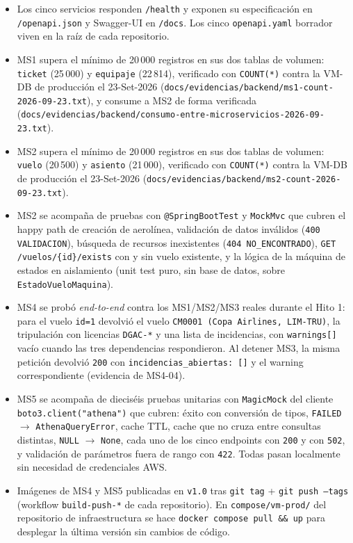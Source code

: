 \begin{itemize}
  \item Los cinco servicios responden \texttt{/health} y exponen su
    especificación en \texttt{/openapi.json} y Swagger-UI en
    \texttt{/docs}. Los cinco \texttt{openapi.yaml} borrador viven en la
    raíz de cada repositorio.
  \item MS1 supera el mínimo de 20\,000 registros en sus dos tablas de
    volumen: \texttt{ticket} (25\,000) y \texttt{equipaje} (22\,814),
    verificado con \texttt{COUNT(*)} contra la VM-DB de producción el
    23-Set-2026 (\texttt{docs/evidencias/backend/ms1-count-2026-09-23.txt}),
    y consume a MS2 de forma verificada
    (\texttt{docs/evidencias/backend/consumo-entre-microservicios-2026-09-23.txt}).
  \item MS2 supera el mínimo de 20\,000 registros en sus dos tablas de
    volumen: \texttt{vuelo} (20\,500) y \texttt{asiento} (21\,000),
    verificado con \texttt{COUNT(*)} contra la VM-DB de producción el
    23-Set-2026 (\texttt{docs/evidencias/backend/ms2-count-2026-09-23.txt}).
  \item MS2 se acompaña de pruebas con \texttt{@SpringBootTest} y
    \texttt{MockMvc} que cubren el happy path de creación de aerolínea,
    validación de datos inválidos (\texttt{400 VALIDACION}), búsqueda
    de recursos inexistentes (\texttt{404 NO\_ENCONTRADO}),
    \texttt{GET /vuelos/\{id\}/exists} con y sin vuelo existente, y la
    lógica de la máquina de estados en aislamiento (unit test puro,
    sin base de datos, sobre \texttt{EstadoVueloMaquina}).
  \item MS4 se probó \emph{end-to-end} contra los MS1/MS2/MS3 reales
    durante el Hito 1: para el vuelo \texttt{id=1} devolvió el vuelo
    \texttt{CM0001 (Copa Airlines, LIM-TRU)}, la tripulación con
    licencias \texttt{DGAC-*} y una lista de incidencias, con
    \texttt{warnings[]} vacío cuando las tres dependencias respondieron.
    Al detener MS3, la misma petición devolvió \texttt{200} con
    \texttt{incidencias\_abiertas: []} y el warning correspondiente
    (evidencia de MS4-04).
  \item MS5 se acompaña de dieciséis pruebas unitarias con
    \texttt{MagicMock} del cliente \texttt{boto3.client("athena")} que
    cubren: éxito con conversión de tipos, \texttt{FAILED} $\to$
    \texttt{AthenaQueryError}, cache TTL, cache que no cruza entre
    consultas distintas, \texttt{NULL} $\to$ \texttt{None}, cada uno de
    los cinco endpoints con \texttt{200} y con \texttt{502}, y
    validación de parámetros fuera de rango con \texttt{422}. Todas
    pasan localmente sin necesidad de credenciales AWS.
  \item Imágenes de MS4 y MS5 publicadas en \texttt{v1.0} tras
    \texttt{git tag} + \texttt{git push --tags} (workflow
    \texttt{build-push-*} de cada repositorio). En \texttt{compose/vm-prod/}
    del repositorio de infraestructura se hace \texttt{docker compose
    pull \&\& up} para desplegar la última versión sin cambios de
    código.
\end{itemize}

